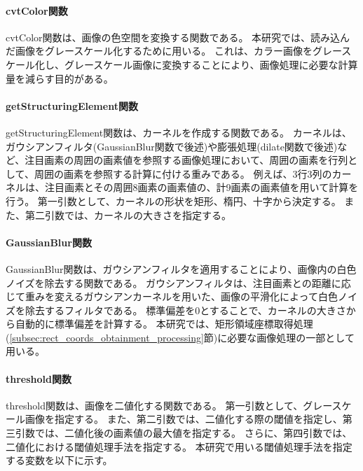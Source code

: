 \paragraph{cvtColor関数}
cvtColor関数は、画像の色空間を変換する関数である。
本研究では、読み込んだ画像をグレースケール化するために用いる。
これは、カラー画像をグレースケール化し、グレースケール画像に変換することにより、画像処理に必要な計算量を減らす目的がある。

\paragraph{getStructuringElement関数}
getStructuringElement関数は、カーネルを作成する関数である。
カーネルは、ガウシアンフィルタ(GaussianBlur関数で後述)や膨張処理(dilate関数で後述)など、注目画素の周囲の画素値を参照する画像処理において、周囲の画素を行列として、周囲の画素を参照する計算に付ける重みである。
例えば、3行3列のカーネルは、注目画素とその周囲8画素の画素値の、計9画素の画素値を用いて計算を行う。
第一引数として、カーネルの形状を矩形、楕円、十字から決定する。
また、第二引数では、カーネルの大きさを指定する。

\paragraph{GaussianBlur関数}
GaussianBlur関数は、ガウシアンフィルタを適用することにより、画像内の白色ノイズを除去する関数である。
ガウシアンフィルタは、注目画素との距離に応じて重みを変えるガウシアンカーネルを用いた、画像の平滑化によって白色ノイズを除去するフィルタである。
標準偏差を0とすることで、カーネルの大きさから自動的に標準偏差を計算する\cite{ガウシアンフィルタ}。
本研究では、矩形領域座標取得処理(\ref{subsec:rect_coords_obtainment_processing}節)に必要な画像処理の一部として用いる。

\paragraph{threshold関数}
threshold関数は、画像を二値化する関数である。
第一引数として、グレースケール画像を指定する。
また、第二引数では、二値化する際の閾値を指定し、第三引数では、二値化後の画素値の最大値を指定する。
さらに、第四引数では、二値化における閾値処理手法を指定する。
本研究で用いる閾値処理手法を指定する変数を以下に示す。

